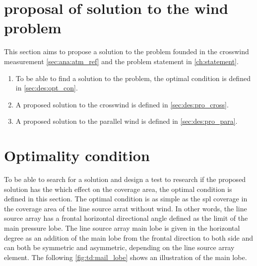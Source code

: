 \section{proposal of solution to the wind problem}\label{sec:td:pro_sol_pro}

This section aims to propose a solution to the problem founded in the crosswind measurement \autoref{sec:ana:atm_ref} and the problem statement in \autoref{ch:statement}. 

\begin{enumerate}
\item To be able to find a solution to the problem, the optimal condition is defined in \autoref{sec:des:opt_con}.
\item A proposed solution to the crosswind is defined in \autoref{sec:des:pro_cross}.
\item A proposed solution to the parallel wind is defined in \autoref{sec:des:pro_para}.
\end{enumerate}





\section{Optimality condition}\label{sec:des:opt_con}

To be able to search for a solution and design a test to research if the proposed solution has the which effect on the coverage area, the optimal condition is defined in this section. The optimal condition is as simple as the \gls{spl} coverage in the coverage area of the line source arrat without wind. In other words, the line source array has a frontal horizontal directional angle defined as the  limit of the main pressure lobe. The line source array main lobe is given in the horizontal degree as an addition of the main lobe from the frontal direction to both side and can both be symmetric and asymmetric, depending on the line source array element. The following \autoref{fig:td:mail_lobe} shows an illustration of the main lobe. 


